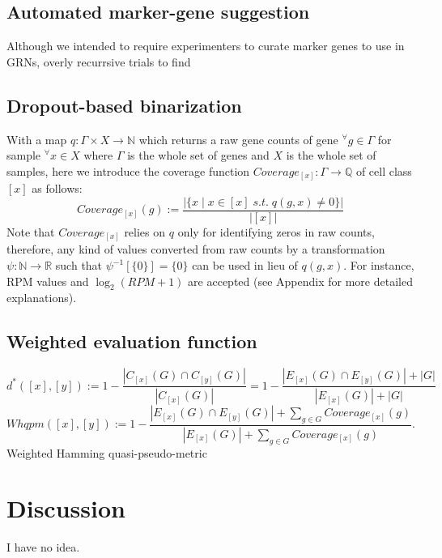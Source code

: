 \documentclass{article}
\begin{document}
\subsection*{Automated marker-gene suggestion}
Although we intended to require experimenters to curate marker genes to use
in GRNs, overly recurrsive trials to find 

\subsection*{Dropout-based binarization}
With a map $q: \Gamma\times X\rightarrow \mathbb{N}$ which returns a raw gene counts
of gene $^\forall g\in\Gamma$ for sample $^\forall x\in X$ where $\Gamma$ is the whole set of genes 
and $X$ is the whole set of samples, here we introduce the coverage function $Coverage_{[x]}: \Gamma\rightarrow\mathbb{Q}$ 
of cell class $[x]$ as follows:
\begin{equation}\label{coverage}
  Coverage_{[x]}(g):=\frac{
    |\{x\;|\;x\in[x]\;s.t.\;q(g,x)\neq 0\}|
  }{
    |[x]|
  }
\end{equation}
Note that $Coverage_{[x]}$ relies on $q$ only for identifying zeros in raw counts, therefore, 
any kind of values converted from raw counts by a transformation $\psi: \mathbb{N}\rightarrow\mathbb{R}$ 
such that $\psi^{-1}[\{0\}]=\{0\}$ can be used in lieu of $q(g, x)$. For instance, \ac{RPM} values 
and $\log_2(RPM+1)$ are accepted (see Appendix for more detailed explanations).

\subsection*{Weighted evaluation function}
\begin{equation}\label{HQPM}
  d^*([x], [y]) := 1 - \frac{|C_{[x]}(G)\cap C_{[y]}(G)|}{|C_{[x]}(G)|}
  =1 - \frac{
    |E_{[x]}(G)\cap E_{[y]}(G)|+|G|
  }{
    |E_{[x]}(G)|+|G|
  }
\end{equation}
\begin{equation}\label{WHQPM}
  Whqpm([x], [y]) := 1 - \frac{
    |E_{[x]}(G)\cap E_{[y]}(G)|+\sum_{g\in G}Coverage_{[x]}(g)
  }{
    |E_{[x]}(G)|+\sum_{g\in G}Coverage_{[x]}(g)
  }.
\end{equation}
Weighted Hamming quasi-pseudo-metric

\section*{Discussion}
I have no idea.
\end{document}

